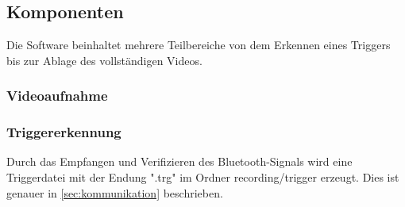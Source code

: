 \subsection{Komponenten}
\label{subsec:evalsys_software}

Die Software beinhaltet mehrere Teilbereiche von dem Erkennen eines Triggers bis zur Ablage des vollständigen Videos.

\subsubsection{Videoaufnahme}

\subsubsection{Triggererkennung}

Durch das Empfangen und Verifizieren des Bluetooth-Signals wird eine Triggerdatei mit der Endung ".trg" im Ordner recording/trigger erzeugt. Dies ist genauer in \ref{sec:kommunikation} beschrieben.

